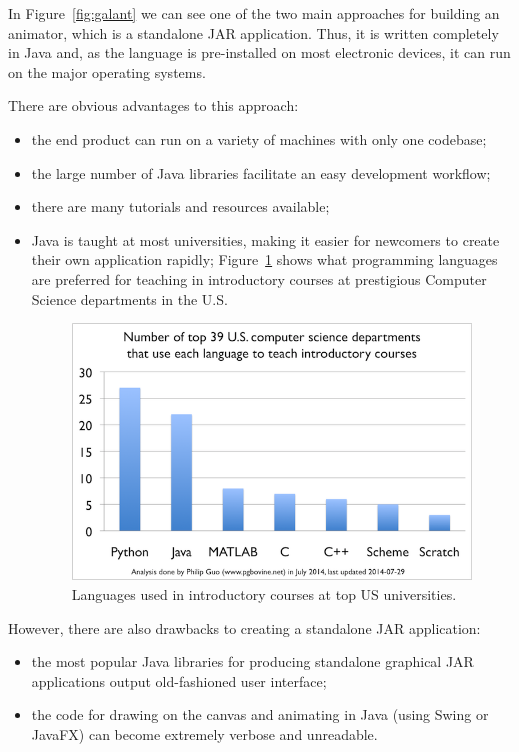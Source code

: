 \documentclass{l4proj}
\begin{document}
In Figure~\ref{fig:galant} we can see one of the two main approaches for building an animator, which is a standalone JAR application. Thus, it is written completely in Java and, as the language is pre-installed on most electronic devices, it can run on the major operating systems.

There are obvious advantages to this approach:
\begin{itemize}
	\item the end product can run on a variety of machines with only one codebase;
	\item the large number of Java libraries facilitate an easy development workflow;
    \item there are many tutorials and resources available;
    \item Java is taught at most universities, making it easier for newcomers to create their
      own application rapidly; Figure~\ref{fig:java-uni} shows what programming languages are preferred for teaching in
      introductory courses at prestigious Computer Science departments in the U.S.

\begin{figure}[!ht]
\centering
\includegraphics[scale=0.8]{java-uni}
\caption{Languages used in introductory courses at top US universities.}
\label{fig:java-uni}
\end{figure}
\end{itemize}

\pagebreak

However, there are also drawbacks to creating a standalone JAR application:
\begin{itemize}
\item the most popular Java libraries for producing standalone graphical JAR applications output old-fashioned user
  interface;
\item the code for drawing on the canvas and animating in Java (using Swing or JavaFX) can become extremely verbose
  and unreadable.
\end{itemize}
\end{document}

